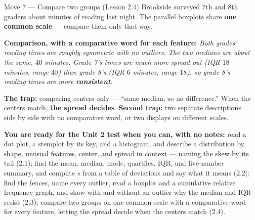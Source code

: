 \documentclass[10pt]{article}
\newcommand{\drawbox}[7]{%
  \draw[charcoal, thick] (#2,#1) -- (#3,#1);
  \draw[charcoal, thick] (#5,#1) -- (#6,#1);
  \draw[charcoal, thick] (#2,#1-0.15) -- (#2,#1+0.15);
  \draw[charcoal, thick] (#6,#1-0.15) -- (#6,#1+0.15);
  \filldraw[fill=frost, draw=cerulean, thick] (#3,#1-0.3) rectangle (#5,#1+0.3);
  \draw[cerulean, very thick] (#4,#1-0.3) -- (#4,#1+0.3);
  \node[left, font=\small\bfseries] at (#2-0.2,#1) {#7};}
\begin{document}
\vspace{3pt}
\boxguard[26]
\begin{notesbox}{Move 7 --- Compare two groups (Lesson 2.4)}
\small
Brookside surveyed $7$th and $8$th graders about minutes of reading last night. The parallel
boxplots share \textbf{one common scale} --- compare them only that way.

\vspace{2pt}
\begin{center}
\end{center}

\textbf{Comparison, with a comparative word for each feature:} \emph{Both grades' reading
times are roughly symmetric with no outliers. The two medians are about the same, $40$
minutes. Grade 7's times are much more spread out (IQR $18$ minutes, range $40$) than grade 8's
(IQR $6$ minutes, range $18$), so grade 8's reading times are more \textbf{consistent}.}

\vspace{3pt}
\textbf{The trap:} comparing centers only --- ``same median, so no difference.'' When the
centers match, \textbf{the spread decides}. \textbf{Second trap:} two separate descriptions
side by side with no comparative word, or two displays on different scales.
\end{notesbox}
\normalsize

\vspace{6pt}
\boxguard[12]
\begin{remindbox}
\small
\textbf{You are ready for the Unit 2 test when you can, with no notes:}
read a dot plot, a stemplot by its key, and a histogram, and describe a distribution by shape,
unusual features, center, and spread in context --- naming the skew by its tail (2.1);
find the mean, median, mode, quartiles, IQR, and five-number summary, and compute $s$ from a
table of deviations and say what it means (2.2);
find the fences, name every outlier, read a boxplot and a cumulative relative frequency graph,
and show with and without an outlier why the median and IQR resist (2.3);
compare two groups on one common scale with a comparative word for every feature, letting the
spread decide when the centers match (2.4).
\end{remindbox}
\end{document}
